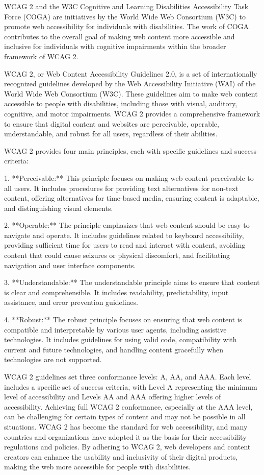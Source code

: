 \documentclass{article}
\begin{document}
WCAG 2 and the W3C Cognitive and Learning Disabilities Accessibility Task Force (COGA) are initiatives by the World Wide Web Consortium (W3C) to promote web accessibility for individuals with disabilities. The work of COGA contributes to the overall goal of making web content more accessible and inclusive for individuals with cognitive impairments within the broader framework of WCAG 2.


WCAG 2, or Web Content Accessibility Guidelines 2.0, is a set of internationally recognized guidelines developed by the Web Accessibility Initiative (WAI) of the World Wide Web Consortium (W3C). These guidelines aim to make web content accessible to people with disabilities, including those with visual, auditory, cognitive, and motor impairments. WCAG 2 provides a comprehensive framework to ensure that digital content and websites are perceivable, operable, understandable, and robust for all users, regardless of their abilities.

WCAG 2 provides four main principles, each with specific guidelines and success criteria:

1. **Perceivable:** This principle focuses on making web content perceivable to all users. It includes procedures for providing text alternatives for non-text content, offering alternatives for time-based media, ensuring content is adaptable, and distinguishing visual elements.

2. **Operable:** The principle emphasizes that web content should be easy to navigate and operate. It includes guidelines related to keyboard accessibility, providing sufficient time for users to read and interact with content, avoiding content that could cause seizures or physical discomfort, and facilitating navigation and user interface components.

3. **Understandable:** The understandable principle aims to ensure that content is clear and comprehensible. It includes readability, predictability, input assistance, and error prevention guidelines.

4. **Robust:** The robust principle focuses on ensuring that web content is compatible and interpretable by various user agents, including assistive technologies. It includes guidelines for using valid code, compatibility with current and future technologies, and handling content gracefully when technologies are not supported.

WCAG 2 guidelines set three conformance levels: A, AA, and AAA. Each level includes a specific set of success criteria, with Level A representing the minimum level of accessibility and Levels AA and AAA offering higher levels of accessibility. Achieving full WCAG 2 conformance, especially at the AAA level, can be challenging for certain types of content and may not be possible in all situations. WCAG 2 has become the standard for web accessibility, and many countries and organizations have adopted it as the basis for their accessibility regulations and policies. By adhering to WCAG 2, web developers and content creators can enhance the usability and inclusivity of their digital products, making the web more accessible for people with disabilities.
\end{document}
